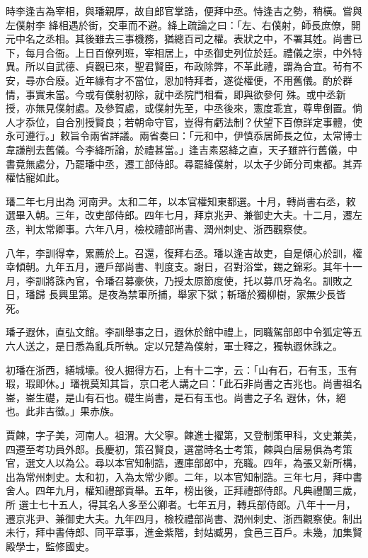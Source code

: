 \begin{pinyinscope}
 時李逢吉為宰相，與璠親厚，故自郎官掌誥，便拜中丞。恃逢吉之勢，稍橫。嘗與左僕射李
 絳相遇於街，交車而不避。絳上疏論之曰：「左、右僕射，師長庶僚，開元中名之丞相。其後雖去三事機務，猶總百司之權。表狀之中，不署其姓。尚書已下，每月合衙。上日百僚列班，宰相居上，中丞御史列位於廷。禮儀之崇，中外特異。所以自武德、貞觀已來，聖君賢臣，布政除弊，不革此禮，謂為合宜。茍有不安，尋亦合廢。近年緣有才不當位，恩加特拜者，遂從權便，不用舊儀。酌於群情，事實未當。今或有僕射初除，就中丞院門相看，即與欲參何
 殊。或中丞新授，亦無見僕射處。及參賀處，或僕射先至，中丞後來，憲度乖宜，尊卑倒置。倘人才忝位，自合別授賢良；若朝命守官，豈得有虧法制？伏望下百僚詳定事體，使永可遵行。」敕旨令兩省詳議。兩省奏曰：「元和中，伊慎忝居師長之位，太常博士韋謙削去舊儀。今李絳所論，於禮甚當。」逢吉素惡絳之直，天子雖許行舊儀，中書竟無處分，乃罷璠中丞，遷工部侍郎。尋罷絳僕射，以太子少師分司東都。其弄權怙寵如此。



 璠二年七月出為
 河南尹。太和二年，以本官權知東都選。十月，轉尚書右丞，敕選畢入朝。三年，改吏部侍郎。四年七月，拜京兆尹、兼御史大夫。十二月，遷左丞，判太常卿事。六年八月，檢校禮部尚書、潤州刺史、浙西觀察使。



 八年，李訓得幸，累薦於上。召還，復拜右丞。璠以逢吉故吏，自是傾心於訓，權幸傾朝。九年五月，遷戶部尚書、判度支。謝日，召對浴堂，錫之錦彩。其年十一月，李訓將誅內官，令璠召募豪俠，乃授太原節度使，托以募爪牙為名。訓敗之日，璠歸
 長興里第。是夜為禁軍所捕，舉家下獄；斬璠於獨柳樹，家無少長皆死。



 璠子遐休，直弘文館。李訓舉事之日，遐休於館中禮上，同職駕部郎中令狐定等五六人送之，是日悉為亂兵所執。定以兄楚為僕射，軍士釋之，獨執遐休誅之。



 初璠在浙西，繕城壕。役人掘得方石，上有十二字，云：「山有石，石有玉，玉有瑕，瑕即休。」璠視莫知其旨，京口老人講之曰：「此石非尚書之吉兆也。尚書祖名崟，崟生礎，是山有石也。礎生尚書，是石有玉也。尚書之子名
 遐休，休，絕也。此非吉徵。」果赤族。



 賈餗，字子美，河南人。祖渭。大父寧。餗進士擢第，又登制策甲科，文史兼美，四遷至考功員外郎。長慶初，策召賢良，選當時名士考策，餗與白居易俱為考策官，選文人以為公。尋以本官知制誥，遷庫部郎中，充職。四年，為張又新所構，出為常州刺史。太和初，入為太常少卿。二年，以本官知制誥。三年七月，拜中書舍人。四年九月，權知禮部貢舉。五年，榜出後，正拜禮部侍郎。凡典禮闈三歲，所
 選士七十五人，得其名人多至公卿者。七年五月，轉兵部侍郎。八年十一月，遷京兆尹、兼御史大夫。九年四月，檢校禮部尚書、潤州刺史、浙西觀察使。制出未行，拜中書侍郎、同平章事，進金紫階，封姑臧男，食邑三百戶。未幾，加集賢殿學士，監修國史。




\end{pinyinscope}
